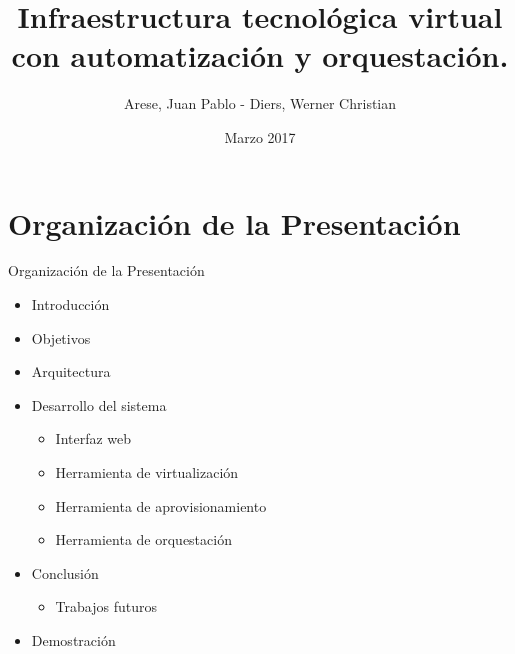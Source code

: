 \usepackage[english]{babel}
\usepackage[utf8x]{inputenc}

\title[Your Short Title]{Infraestructura tecnológica virtual con automatización y orquestación.}
\author{Arese, Juan Pablo - Diers, Werner Christian}
\date{Marzo 2017}




\begin{frame}
  \titlepage
\end{frame}


\section{Organización de la Presentación}

\begin{frame}{Organización de la Presentación}
    \vspace{-1cm}
    \begin{itemize}
        \item Introducción
        \item Objetivos
        \item Arquitectura
        \item Desarrollo del sistema
        \begin{itemize}
            \item Interfaz web
            \item Herramienta de virtualización
            \item Herramienta de aprovisionamiento
            \item Herramienta de orquestación          
        \end{itemize}
        \item Conclusión
        \begin{itemize}
            \item Trabajos futuros
        \end{itemize}
        \item Demostración
    \end{itemize}

\end{frame}


